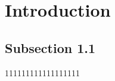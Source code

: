 \section{Introduction}
\label{sec:introduction}
\subsection{Subsection 1.1}

111111111111111111









\FloatBarrier %



